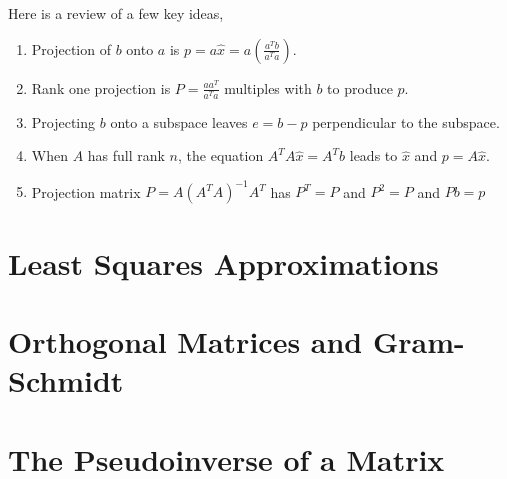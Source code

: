 Here is a review of a few key ideas, 
\begin{enumerate}
    \item Projection of \(b\) onto \(a\) is \(p = a\hat{x} = a(\frac{a^T b}{a^T a})\). 
    \item Rank one projection is \(P = \frac{aa^T}{a^T a}\) multiples with \(b\) to produce \(p\). 
    \item Projecting \(b\) onto a subspace leaves \(e = b - p\) perpendicular to the subspace.
    \item When \(A\) has full rank \(n\), the equation \(A^T A \hat{x} = A^T b\) leads to \(\hat{x}\) and \(p = A\hat{x}\). 
    \item Projection matrix \(P = A(A^T A)^{-1} A^T \) has \(P^T = P\) and \(P^2 = P\) and \(Pb = p\)                 
\end{enumerate}
\section{Least Squares Approximations}

\section{Orthogonal Matrices and Gram-Schmidt}

\section{The Pseudoinverse of a Matrix}
